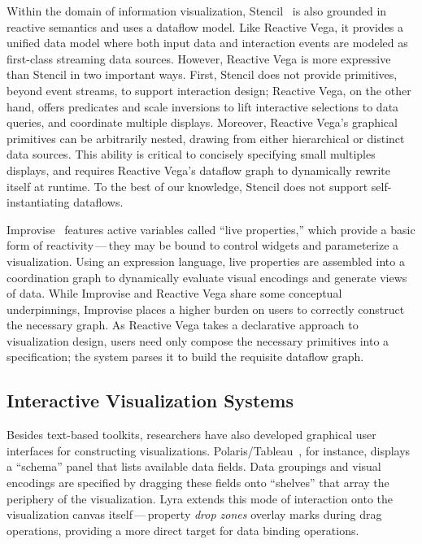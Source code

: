Within the domain of information visualization, Stencil~\cite{cottam:stencil} is
also grounded in reactive semantics and uses a dataflow model. Like Reactive
Vega, it provides a unified data model where both input data and interaction
events are modeled as first-class streaming data sources. However, Reactive Vega
is more expressive than Stencil in two important ways. First, Stencil does not
provide primitives, beyond event streams, to support interaction design;
Reactive Vega, on the other hand, offers predicates and scale inversions to lift
interactive selections to data queries, and coordinate multiple displays.
Moreover, Reactive Vega's graphical primitives can be arbitrarily nested,
drawing from either hierarchical or distinct data sources. This ability is
critical to concisely specifying small multiples displays, and requires Reactive
Vega's dataflow graph to dynamically rewrite itself at runtime. To the best of
our knowledge, Stencil does not support self-instantiating dataflows.

Improvise~\cite{weaver:improvise} features active variables called ``live
properties,'' which provide a basic form of reactivity\,---\,they may be bound
to control widgets and parameterize a visualization. Using an expression
language, live properties are assembled into a coordination graph to dynamically
evaluate visual encodings and generate views of data. While Improvise and
Reactive Vega share some conceptual underpinnings, Improvise places a higher
burden on users to correctly construct the necessary graph. As Reactive Vega
takes a declarative approach to visualization design, users need only compose
the necessary primitives into a specification; the system parses it to build the
requisite dataflow graph.

\vspace{-10pt}

\subsection{Interactive Visualization Systems}

\vspace{-10pt}

Besides text-based toolkits, researchers have also developed graphical user
interfaces for constructing visualizations.
Polaris/Tableau~\cite{stolte:polaris}, for instance, displays a ``schema'' panel
that lists available data fields. Data groupings and visual encodings are
specified by dragging these fields onto ``shelves'' that array the periphery of
the visualization. Lyra extends this mode of interaction onto the visualization
canvas itself\,---\,property \emph{drop zones} overlay marks during drag
operations, providing a more direct target for data binding operations.

